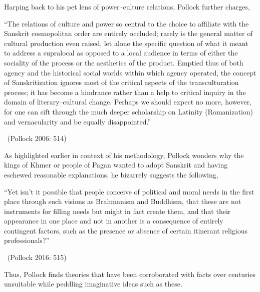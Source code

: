 Harping back to his pet lens of power–culture relations, Pollock further charges,

\begin{myquote}
“The relations of culture and power so central to the choice to affiliate with the Sanskrit cosmopolitan order are entirely occluded; rarely is the general matter of cultural production even raised, let alone the specific question of what it meant to address a supralocal as opposed to a local audience in terms of either the sociality of the process or the aesthetics of the product. Emptied thus of both agency and the historical social worlds within which agency operated, the concept of Sanskritization ignores most of the critical aspects of the transculturation process; it has become a hindrance rather than a help to critical inquiry in the domain of literary–cultural change. Perhaps we should expect no more, however, for one can sift through the much deeper scholarship on Latinity (Romanization) and vernacularity and be equally disappointed.” 

~\hfill (Pollock 2006: 514)
\end{myquote}

As highlighted earlier in context of his methodology, Pollock wonders why the kings of Khmer or people of Pagan wanted to adopt Sanskrit and having eschewed reasonable explanations, he bizarrely suggests the following,

\begin{myquote}
“Yet isn’t it possible that people conceive of political and moral needs in the first place through such visions as Brahmanism and Buddhism, that these are not instruments for filling needs but might in fact create them, and that their appearance in one place and not in another is a consequence of entirely contingent factors, such as the presence or absence of certain itinerant religious professionals?” 

~\hfill (Pollock 2016: 515)
\end{myquote}

\newpage

Thus, Pollock finds theories that have been corroborated with facts over centuries unsuitable while peddling imaginative ideas such as these.

